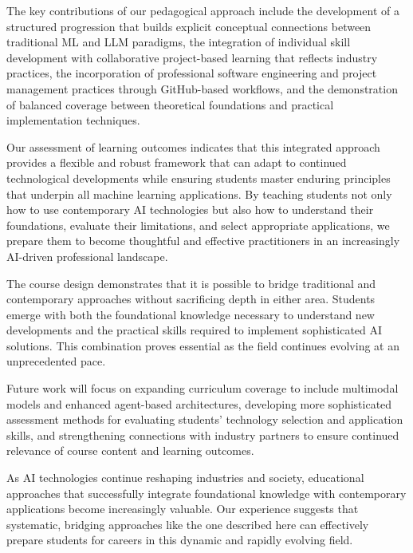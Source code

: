 \documentclass{article}
\begin{document}
The key contributions of our pedagogical approach include the development of a structured progression that builds explicit conceptual connections between traditional ML and LLM paradigms, the integration of individual skill development with collaborative project-based learning that reflects industry practices, the incorporation of professional software engineering and project management practices through GitHub-based workflows, and the demonstration of balanced coverage between theoretical foundations and practical implementation techniques.

Our assessment of learning outcomes indicates that this integrated approach provides a flexible and robust framework that can adapt to continued technological developments while ensuring students master enduring principles that underpin all machine learning applications. By teaching students not only how to use contemporary AI technologies but also how to understand their foundations, evaluate their limitations, and select appropriate applications, we prepare them to become thoughtful and effective practitioners in an increasingly AI-driven professional landscape.

The course design demonstrates that it is possible to bridge traditional and contemporary approaches without sacrificing depth in either area. Students emerge with both the foundational knowledge necessary to understand new developments and the practical skills required to implement sophisticated AI solutions. This combination proves essential as the field continues evolving at an unprecedented pace.

Future work will focus on expanding curriculum coverage to include multimodal models and enhanced agent-based architectures, developing more sophisticated assessment methods for evaluating students' technology selection and application skills, and strengthening connections with industry partners to ensure continued relevance of course content and learning outcomes.

As AI technologies continue reshaping industries and society, educational approaches that successfully integrate foundational knowledge with contemporary applications become increasingly valuable. Our experience suggests that systematic, bridging approaches like the one described here can effectively prepare students for careers in this dynamic and rapidly evolving field.

\medskip

\printbibliography
\end{document}
